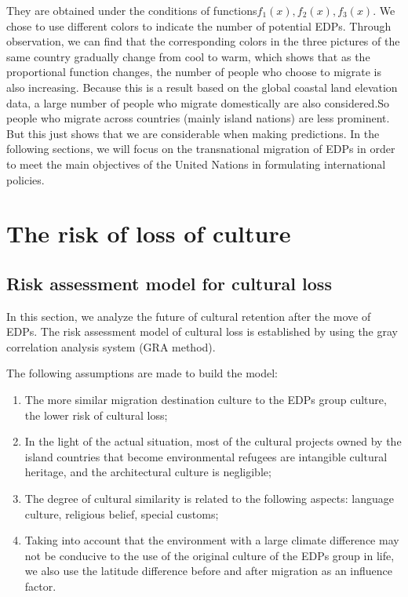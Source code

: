 \documentclass{mcmthesis}
\begin{document}
They are obtained under the conditions of functions$ f_{1}(x),f_{2}(x),f_{3}(x)  $. We chose to use different colors to indicate the number of potential EDPs. Through observation, we can find that the corresponding colors in the three pictures of the same country gradually change from cool to warm, which shows that as the proportional function changes, the number of people who choose to migrate is also increasing. Because this is a result based on the global coastal land elevation data, a large number of people who migrate domestically are also considered.So people who migrate across countries (mainly island nations) are less prominent. But this just shows that we are considerable when making predictions. In the following sections, we will focus on the transnational migration of EDPs in order to meet the main objectives of the United Nations in formulating international policies.































\section{The risk of loss of culture}
\subsection{Risk assessment model for cultural loss}

In this section, we analyze the future of cultural retention after the move of EDPs. The risk assessment model of cultural loss is established by using the gray correlation analysis system (GRA method).

The following assumptions are made to build the model:
\begin{enumerate}
	\item The more similar migration destination culture to the EDPs group culture, the lower risk of cultural loss;
	\item In the light of the actual situation, most of the cultural projects owned by the island countries that become environmental refugees are intangible cultural heritage, and the architectural culture is negligible;
	\item The degree of cultural similarity is related to the following aspects: language culture, religious belief, special customs;
	\item Taking into account that the environment with a large climate difference may not be conducive to the use of the original culture of the EDPs group in life, we also use the latitude difference before and after migration as an influence factor. 
\end{enumerate}
\end{document}
